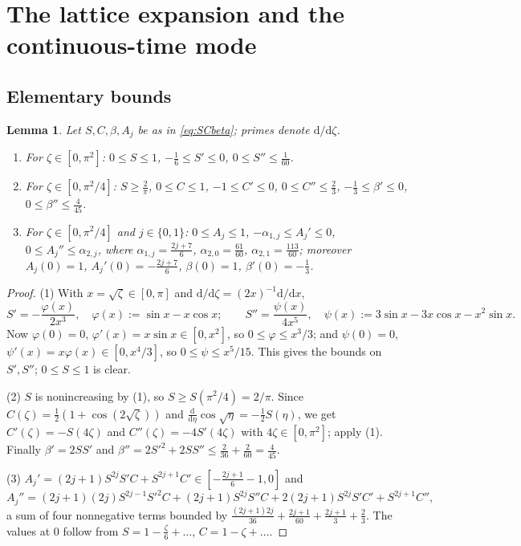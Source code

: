 \documentclass[11pt,a4paper]{article}
\newtheorem{lemma}[theorem]{Lemma}
\theoremstyle{definition}
\theoremstyle{remark}
\newcommand{\dd}{\mathrm{d}}
\begin{document}
\section{The lattice expansion and the continuous-time mode}\label{sec:lattice}

\subsection{Elementary bounds}

\begin{lemma}\label{lem:elem}
Let $S,C,\beta,A_j$ be as in \eqref{eq:SCbeta}; primes denote $\dd/\dd\zeta$.
\begin{enumerate}
\item For $\zeta\in[0,\pi^2]$: $0\le S\le1$, $-\frac16\le S'\le0$, $0\le S''\le\frac1{60}$.
\item For $\zeta\in[0,\pi^2/4]$: $S\ge\frac2\pi$, $0\le C\le1$, $-1\le C'\le0$, $0\le C''\le\frac23$,
 $-\frac13\le\beta'\le0$, $0\le\beta''\le\frac4{45}$.
\item For $\zeta\in[0,\pi^2/4]$ and $j\in\{0,1\}$: $0\le A_j\le1$, $-\alpha_{1,j}\le A_j'\le0$,
 $0\le A_j''\le\alpha_{2,j}$, where $\alpha_{1,j}=\frac{2j+7}6$, $\alpha_{2,0}=\frac{61}{60}$, $\alpha_{2,1}=\frac{113}{60}$;
 moreover $A_j(0)=1$, $A_j'(0)=-\frac{2j+7}6$, $\beta(0)=1$, $\beta'(0)=-\frac13$.
\end{enumerate}
\end{lemma}
\begin{proof}
(1) With $x=\sqrt\zeta\in[0,\pi]$ and $\dd/\dd\zeta=(2x)^{-1}\dd/\dd x$,
\[
 S'=-\frac{\varphi(x)}{2x^3},\quad \varphi(x):=\sin x-x\cos x;\qquad
 S''=\frac{\psi(x)}{4x^5},\quad\psi(x):=3\sin x-3x\cos x-x^2\sin x .
\]
Now $\varphi(0)=0$, $\varphi'(x)=x\sin x\in[0,x^2]$, so $0\le\varphi\le x^3/3$; and $\psi(0)=0$,
$\psi'(x)=x\varphi(x)\in[0,x^4/3]$, so $0\le\psi\le x^5/15$. This gives the bounds on $S',S''$; $0\le S\le1$ is clear.

(2) $S$ is nonincreasing by (1), so $S\ge S(\pi^2/4)=2/\pi$. Since $C(\zeta)=\frac12(1+\cos(2\sqrt\zeta))$ and
$\frac{\dd}{\dd\eta}\cos\sqrt\eta=-\frac12S(\eta)$, we get $C'(\zeta)=-S(4\zeta)$ and $C''(\zeta)=-4S'(4\zeta)$ with
$4\zeta\in[0,\pi^2]$; apply (1). Finally $\beta'=2SS'$ and $\beta''=2S'^2+2SS''\le\frac2{36}+\frac2{60}=\frac4{45}$.

(3) $A_j'=(2j+1)S^{2j}S'C+S^{2j+1}C'\in[-\frac{2j+1}6-1,0]$ and
\[
 A_j''=(2j+1)(2j)S^{2j-1}S'^2C+(2j+1)S^{2j}S''C+2(2j+1)S^{2j}S'C'+S^{2j+1}C'' ,
\]
a sum of four nonnegative terms bounded by $\frac{(2j+1)2j}{36}+\frac{2j+1}{60}+\frac{2j+1}3+\frac23$.
The values at $0$ follow from $S=1-\frac\zeta6+\dots$, $C=1-\zeta+\dots$.
\end{proof}
\end{document}
